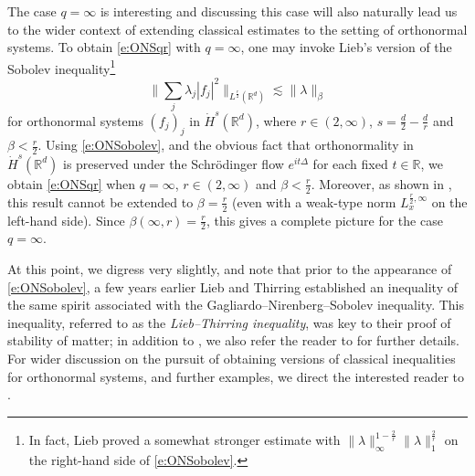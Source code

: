 \documentclass[a4paper]{amsart}
\numberwithin{equation}{section}%
\theoremstyle{plain}%
\theoremstyle{definition}
\theoremstyle{remark}%
\begin{document}
The case $q = \infty$ is interesting and discussing this case will also naturally lead us to the wider context of extending classical estimates to the setting of orthonormal systems. To obtain \eqref{e:ONSqr} with $q = \infty$, one may invoke Lieb's version of the Sobolev inequality\footnote{In fact, Lieb \cite{Lieb_Sobolev} proved a somewhat stronger estimate with $\|\lambda\|_\infty^{1 - \frac{2}{r}} \|\lambda \|_1^{\frac{2}{r}}$ on the right-hand side of \eqref{e:ONSobolev}.}
\begin{equation} \label{e:ONSobolev}
\bigg\| \sum_j \lambda_j |f_j|^2 \bigg\|_{L^{\frac{r}{2}}(\mathbb{R}^d)} \lesssim \| \lambda\|_{\beta}
\end{equation}
for orthonormal systems $(f_j)_j$ in $\dot{H}^s(\mathbb{R}^d)$, where $r \in (2,\infty)$, $s = \frac{d}{2} - \frac{d}{r}$ and $\beta < \frac{r}{2}$. Using \eqref{e:ONSobolev}, and the obvious fact that orthonormality in $\dot{H}^s(\mathbb{R}^d)$ is preserved under the Schr\"odinger flow $e^{it\Delta}$ for each fixed $t \in \mathbb{R}$, we obtain \eqref{e:ONSqr} when $q = \infty$, $r \in (2,\infty)$ and $\beta < \frac{r}{2}$. Moreover, as shown in \cite[Proposition 7.1]{BHLNS},  this result cannot be extended to $\beta = \frac{r}{2}$ (even with a weak-type norm $L^{\frac{r}{2},\infty}_x$ on the left-hand side). 
Since $\beta(\infty,r) = \frac{r}{2}$, this gives a complete picture for the case $q = \infty$.

At this point, we digress very slightly, and note that prior to the appearance of \eqref{e:ONSobolev}, a few years earlier Lieb and Thirring \cite{LiebThirring} established an inequality of the same spirit associated with the Gagliardo--Nirenberg--Sobolev inequality. This inequality, referred to as the \emph{Lieb--Thirring inequality}, was key to their proof of stability of matter; in addition to \cite{LiebThirring}, we also refer the reader to \cite{Lieb_BAMS} for further details. For wider discussion on the pursuit of obtaining versions of classical inequalities for orthonormal systems, and further examples, we direct the interested reader to \cite{Frank_ICM, Frank_9, FrankSabin_Adv, Nakamura, Nguyen}.
\end{document}
